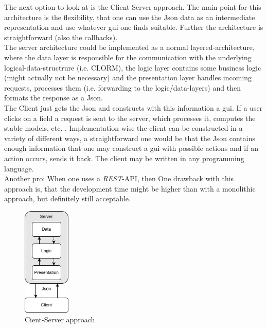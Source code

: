 \documentclass[12pt,a4paper]{article}
\newcommand{\<}[1]{\guilsinglleft}
\renewcommand{\>}[1]{\guilsinglright}
\begin{document}
\noindent The next option to look at is the Client-Server approach. The main point for this architecture is the flexibility, that one can use the Json data as an intermediate representation and use whatever gui one finds suitable. Further the architecture is straightforward (also the callbacks).\\
The server architecture could be implemented as a normal layered-architecture, where the data layer is responsible for the communication with the underlying logical-data-structrure (i.e. CLORM), the logic layer contains some business logic (might actually not be necessary) and the presentation layer handles incoming requests, processes them (i.e. forwarding to the logic/data-layers) and then formats the response as a Json.\\[1em]
The Client just gets the Json and constructs with this information a gui. If a user clicks on a field a request is sent to the server, which processes it, computes the stable models, etc. . Implementation wise the client can be constructed in a variety of different ways, a straightforward one would be that the Json contains enough information that one may construct a gui with possible actions and if an action occurs, sends it back. The client may be written in any programming language. \\[1em]
Another pro: When one uses a \textit{REST}-API, then 
One drawback with this approach is, that the development time might be higher than with a monolithic approach, but definitely still acceptable.

\begin{figure}[ht]
    \begin{center}
    \includegraphics[width=0.2\textwidth]{imgs/client-server.png}
    \caption{Cient-Server approach}
    \label{fig:client-server-v0}
    \end{center}
\end{figure}
\end{document}
